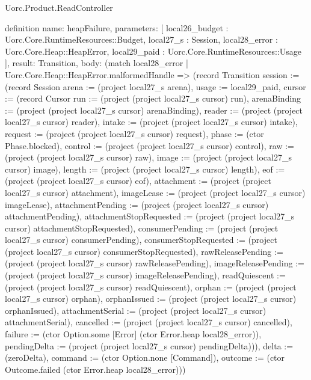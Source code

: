 \begin{lexlean}{Uorc.Product.ReadController}
\begin{semanticmodule}
definition{
  name: heapFailure,
  parameters: [
    local26_budget : Uorc.Core.RuntimeResources::Budget,
    local27_s : Session,
    local28_error : Uorc.Core.Heap::HeapError,
    local29_paid : Uorc.Core.RuntimeResources::Usage
  ],
  result: Transition,
  body: (match local28_error
    | Uorc.Core.Heap::HeapError.malformedHandle => (record Transition {session := (record Session {arena := (project local27_s arena), usage := local29_paid, cursor := (record Cursor {run := (project (project local27_s cursor) run), arenaBinding := (project (project local27_s cursor) arenaBinding), reader := (project (project local27_s cursor) reader), intake := (project (project local27_s cursor) intake), request := (project (project local27_s cursor) request), phase := (ctor Phase.blocked), control := (project (project local27_s cursor) control), raw := (project (project local27_s cursor) raw), image := (project (project local27_s cursor) image), length := (project (project local27_s cursor) length), eof := (project (project local27_s cursor) eof), attachment := (project (project local27_s cursor) attachment), imageLease := (project (project local27_s cursor) imageLease), attachmentPending := (project (project local27_s cursor) attachmentPending), attachmentStopRequested := (project (project local27_s cursor) attachmentStopRequested), consumerPending := (project (project local27_s cursor) consumerPending), consumerStopRequested := (project (project local27_s cursor) consumerStopRequested), rawReleasePending := (project (project local27_s cursor) rawReleasePending), imageReleasePending := (project (project local27_s cursor) imageReleasePending), readQuiescent := (project (project local27_s cursor) readQuiescent), orphan := (project (project local27_s cursor) orphan), orphanIssued := (project (project local27_s cursor) orphanIssued), attachmentSerial := (project (project local27_s cursor) attachmentSerial), cancelled := (project (project local27_s cursor) cancelled), failure := (ctor Option.some [Error] (ctor Error.heap local28_error)), pendingDelta := (project (project local27_s cursor) pendingDelta)})}), delta := (zeroDelta), command := (ctor Option.none [Command]), outcome := (ctor Outcome.failed (ctor Error.heap local28_error))})
}
\end{semanticmodule}
\end{lexlean}

